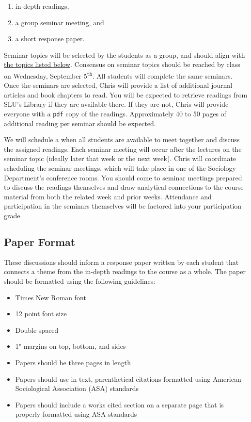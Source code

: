 \documentclass[]{book}
\providecommand{\tightlist}{%
  \setlength{\itemsep}{0pt}\setlength{\parskip}{0pt}}
\theoremstyle{definition}
\theoremstyle{definition}
\theoremstyle{definition}
\theoremstyle{remark}
\begin{document}
\begin{enumerate}
\def\labelenumi{\arabic{enumi}.}
\tightlist
\item
  in-depth readings,
\item
  a group seminar meeting, and
\item
  a short response paper.
\end{enumerate}

Seminar topics will be selected by the students as a group, and should
align with \href{/honors-seminar-topics.html}{the topics listed below}.
Consensus on seminar topics should be reached by class on Wednesday,
September 5\textsuperscript{th}. All students will complete the same
seminars. Once the seminars are selected, Chris will provide a list of
additional journal articles and book chapters to read. You will be
expected to retrieve readings from SLU's Library if they are available
there. If they are not, Chris will provide everyone with a \texttt{pdf}
copy of the readings. Approximately 40 to 50 pages of additional reading
per seminar should be expected.

We will schedule a when all students are available to meet together and
discuss the assigned readings. Each seminar meeting will occur after the
lectures on the seminar topic (ideally later that week or the next
week). Chris will coordinate scheduling the seminar meetings, which will
take place in one of the Sociology Department's conference rooms. You
should come to seminar meetings prepared to discuss the readings
themselves and draw analytical connections to the course material from
both the related week and prior weeks. Attendance and participation in
the seminars themselves will be factored into your participation grade.

\hypertarget{paper-format}{%
\subsection{Paper Format}\label{paper-format}}

These discussions should inform a response paper written by each student
that connects a theme from the in-depth readings to the course as a
whole. The paper should be formatted using the following guidelines:

\begin{itemize}
\tightlist
\item
  Times New Roman font
\item
  12 point font size
\item
  Double spaced
\item
  1" margins on top, bottom, and sides
\item
  Papers should be three pages in length
\item
  Papers should use in-text, parenthetical citations formatted using
  American Sociological Association (ASA) standards
\item
  Papers should include a works cited section on a separate page that is
  properly formatted using ASA standards
\end{itemize}
\end{document}
